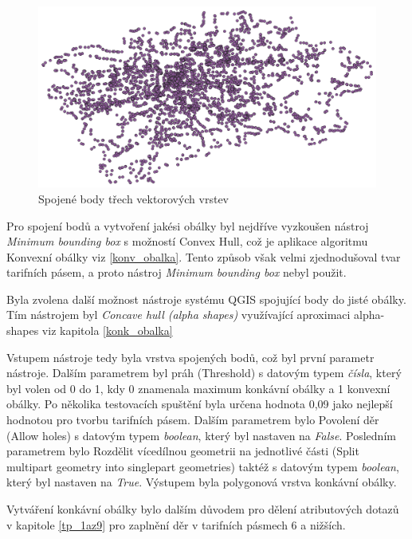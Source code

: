 \begin{figure}[H] \centering
    \includegraphics[width=400pt]{./pictures/merged-P0B.png}
    \caption[Spojené body třech vektorových vrstev]{Spojené body třech vektorových vrstev}
	\label{fig:merged-P0B}              
\end{figure} 

Pro spojení bodů a vytvoření jakési obálky byl nejdříve vyzkoušen nástroj \textit{Minimum bounding box} s možností Convex Hull,
což je aplikace algoritmu Konvexní obálky viz \ref{konv_obalka}. Tento způsob však velmi zjednodušoval tvar
tarifních pásem, a proto nástroj \textit{Minimum bounding box} nebyl použit.

Byla zvolena další možnost nástroje systému QGIS spojující body do jisté obálky. Tím nástrojem byl \textit{Concave hull (alpha shapes)} 
využívající aproximaci alpha-shapes viz kapitola \ref{konk_obalka}

Vstupem nástroje tedy byla vrstva spojených bodů, což byl první parametr
nástroje. Dalším parametrem byl práh (Threshold) s datovým typem \textit{čísla}, který byl volen od 0 do 1,
kdy 0 znamenala maximum konkávní obálky a 1 konvexní obálky. Po několika testovacích spuštění byla 
určena hodnota 0,09 jako nejlepší hodnotou pro tvorbu tarifních pásem. Dalším parametrem bylo Povolení děr (Allow holes) 
s datovým typem \textit{boolean}, který byl nastaven na \textit{False}.
Posledním parametrem bylo Rozdělit vícedílnou geometrii na jednotlivé části (Split multipart geometry 
into singlepart geometries) taktéž s datovým typem \textit{boolean}, který byl nastaven na \textit{True}.  
Výstupem byla polygonová vrstva konkávní obálky. 

Vytváření konkávní obálky bylo dalším důvodem pro dělení atributových dotazů v kapitole \ref{tp_1az9} pro 
zaplnění děr v tarifních pásmech 6 a nižších.  


